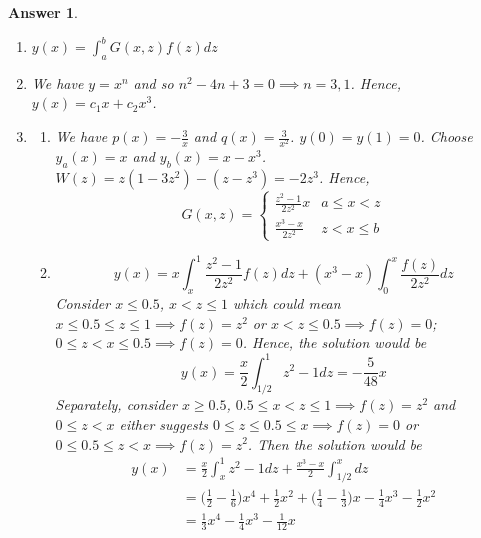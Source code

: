 \documentclass[a4paper]{article}
\newtheorem{ans}{Answer}[section]
\theoremstyle{new}
\begin{document}
\begin{ans}
\begin{enumerate}[label=(\alph*)]
\begin{align}
\end{align}
Giving us our desired $G(x,z)$.
\item $y(x)=\int_a^bG(x,z)f(z)dz$
\item We have $y=x^n$ and so $n^2-4n+3=0\implies n=3,1$. Hence, $y(x)=c_1x+c_2x^3$.
\item \begin{enumerate}[label=(\roman*)]
\item We have $p(x)=-\frac{3}{x}$ and $q(x)=\frac{3}{x^2}$. $y(0)=y(1)=0$. Choose $y_a(x)=x$ and $y_b(x)=x-x^3$. $W(z)=z(1-3z^2)-(z-z^3)=-2z^3$. Hence, 
$$G(x,z)=
\left\{
        \begin{array}{ll}
      \frac{z^2-1}{2z^2}x & a\leq x< z \\
      \frac{x^3-x}{2z^2} & z< x\leq b 
        \end{array}
    \right.$$
\item 
$$y(x)=x\int_x^1\frac{z^2-1}{2z^2}f(z)dz+(x^3-x)\int_0^x\frac{f(z)}{2z^2}dz$$
Consider $x\leq 0.5$, $x< z\leq 1$ which could mean $x\leq0.5\leq z\leq 1\implies f(z)=z^2$ or $x< z\leq 0.5\implies f(z)=0$; $0\leq z< x\leq0.5\implies f(z)=0$. Hence, the solution would be
$$y(x)=\frac{x}{2}\int_{1/2}^1z^2-1dz=-\frac{5}{48}x$$
Separately, consider $x\geq0.5$, $0.5\leq x< z\leq 1\implies f(z)=z^2$ and $0\leq z< x$ either suggests $0\leq z\leq 0.5\leq x\implies f(z)=0$ or $0\leq 0.5\leq z< x\implies f(z)=z^2$.  Then the solution would be
\begin{align}
y(x)&=\frac{x}{2}\int_x^1z^2-1dz+\frac{x^3-x}{2}\int_{1/2}^xdz\nonumber\\&=\bigg(\frac{1}{2}-\frac{1}{6}\bigg)x^4+\frac{1}{2}x^2+\bigg(\frac{1}{4}-\frac{1}{3}\bigg)x-\frac{1}{4}x^3-\frac{1}{2}x^2\nonumber\\&=\frac{1}{3}x^4-\frac{1}{4}x^3-\frac{1}{12}x\nonumber
\end{align}
\end{enumerate}
\end{enumerate}
\end{ans}
\newpage
\end{document}
